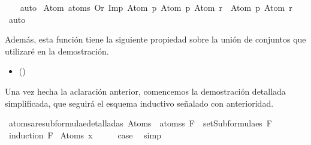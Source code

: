 \begin{isabellebody}
%
\isadelimproof
\ \ %
\endisadelimproof
%
\isatagproof
{}\isamarkupfalse%
\ auto%
\endisatagproof
{\isafoldproof}%
%
\isadelimproof
\isanewline
%
\endisadelimproof
\isanewline
{}\isamarkupfalse%
\ {\isachardoublequoteopen}Atom\ {\isacharbackquote}atoms\ {\isacharparenleft}Or\ {\isacharparenleft}Imp\ {\isacharparenleft}Atom\ p{\isacharparenright}\ {\isacharparenleft}Atom\ p{\isacharparenright}{\isacharparenright}\ {\isacharparenleft}Atom\ r{\isacharparenright}{\isacharparenright}\ {\isacharequal}\ {\isacharbraceleft}Atom\ p{\isacharcomma}\ Atom\ r{\isacharbraceright}{\isachardoublequoteclose}\isanewline
%
\isadelimproof
\ \ %
\endisadelimproof
%
\isatagproof
{}\isamarkupfalse%
\ auto%
\endisatagproof
{\isafoldproof}%
%
\isadelimproof
%
\endisadelimproof
%
\begin{isamarkuptext}%
Además, esta función tiene la siguiente propiedad sobre la unión de conjuntos que utilizaré
en la demostración.\\
 \begin{itemize}
  \item[]  \hfill ()
  \end{itemize}%
\end{isamarkuptext}\isamarkuptrue%
%
\begin{isamarkuptext}%
Una vez hecha la aclaración anterior, comencemos la demostración detallada simplificada, 
que seguirá el esquema inductivo señalado con anterioridad.%
\end{isamarkuptext}\isamarkuptrue%
\isamarkupfalse%
\ atoms{\isacharunderscore}are{\isacharunderscore}subformulae{\isacharunderscore}detallada{\isacharunderscore}s{\isacharcolon}\ {\isachardoublequoteopen}Atom{\isacharunderscore}s\ {\isacharbackquote}\ atoms{\isacharunderscore}s\ F\ {\isasymsubseteq}\ setSubformulae{\isacharunderscore}s\ F{\isachardoublequoteclose}\isanewline
%
\isadelimproof
%
\endisadelimproof
%
\isatagproof
{}\isamarkupfalse%
\ {\isacharparenleft}induction\ F{\isacharparenright}\isanewline
{}\isamarkupfalse%
\ {\isacharparenleft}Atom{\isacharunderscore}s\ x{\isacharparenright}\isanewline
\ \ \isamarkupfalse%
\ \isamarkupfalse%
\ {\isacharquery}case\ \isamarkupfalse%
\ simp\isanewline
{}\isamarkupfalse%
\isanewline
\ \ \isamarkupfalse%

\end{isabellebody}

